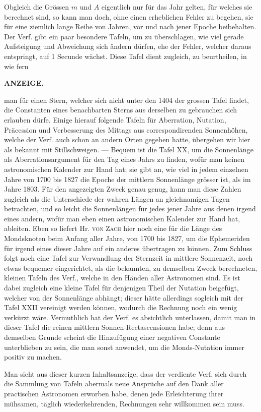 Obgleich die Grössen $m$ und $A$ eigentlich nur für das Jahr gelten, für welches sie berechnet sind, so kann man doch, ohne einen erheblichen Fehler zu begehen, sie für eine ziemlich lange Reihe von Jahren, vor und nach jener Epoche beibehalten. Der Verf. gibt ein paar besondere Tafeln, um zu überschlagen, wie viel gerade Aufsteigung und Abweichung sich ändern dürfen, ehe der Fehler, welcher daraus entspringt, auf 1 Secunde wächst. Diese Tafel dient zugleich, zu beurtheilen, in wie fern\par
\clearpage
\thispagestyle{empty}
\noindent{}%
%
\parbox[t]{\dimexpr\linewidth-24mm\relax}{\centering\footnotesize\bfseries ANZEIGE.\par}%
\makebox[12mm][r]{}\par\medskip
\noindent man für einen Stern, welcher sich nicht unter den 1404 der grossen Tafel findet, die Constanten eines benachbarten Sterns aus derselben zu gebrauchen sich erlauben dürfe. Einige hierauf folgende Tafeln für Aberration, Nutation, Präcession und Verbesserung des Mittags aus correspondirenden Sonnenhöhen, welche der Verf. auch schon an andern Orten gegeben hatte, übergehen wir hier als bekannt mit Stillschweigen. --- Bequem ist die Tafel XX, um die Sonnenlänge als Aberrationsargument für den Tag eines Jahrs zu finden, wofür man keinen astronomischen Kalender zur Hand hat; sie gibt an, wie viel in jedem einzelnen Jahre von 1700 bis 1827 die Epoche der mittlern Sonnenlänge grösser ist, als im Jahre 1803. Für den angezeigten Zweck genau genug, kann man diese Zahlen zugleich als die Unterschiede der wahren Längen an gleichnamigen Tagen betrachten, und so leicht die Sonnenlängen für jedes jener Jahre aus denen irgend eines andern, wofür man eben einen astronomischen Kalender zur Hand hat, ableiten. Eben so liefert Hr. \textsc{von Zach} hier noch eine für die Länge des Mondsknoten beim Anfang aller Jahre, von 1700 bis 1827, um die Ephemeriden für irgend eines dieser Jahre auf ein anderes übertragen zu können. Zum Schluss folgt noch eine Tafel zur Verwandlung der Sternzeit in mittlere Sonnenzeit, noch etwas bequemer eingerichtet, als die bekannten, zu demselben Zweck berechneten, kleinen Tafeln des Verf., welche in den Händen aller Astronomen sind. Es ist dabei zugleich eine kleine Tafel für denjenigen Theil der Nutation beigefügt, welcher von der Sonnenlänge abhängt; dieser hätte allerdings sogleich mit der Tafel XXII vereinigt werden können, wodurch die Rechnung noch ein wenig verkürzt wäre. Vermuthlich hat der Verf. es absichtlich unterlassen, damit man in dieser Tafel die reinen mittlern Sonnen-Rectascensionen habe; denn aus demselben Grunde scheint die Hinzufügung einer negativen Constante unterblieben zu sein, die man sonst anwendet, um die Monds-Nutation immer positiv zu machen.

Man sieht aus dieser kurzen Inhaltsanzeige, dass der verdiente Verf. sich durch die Sammlung von Tafeln abermals neue Ansprüche auf den Dank aller practischen Astronomen erworben habe, denen jede Erleichterung ihrer mühsamen, täglich wiederkehrenden, Rechnungen sehr willkommen sein muss.
